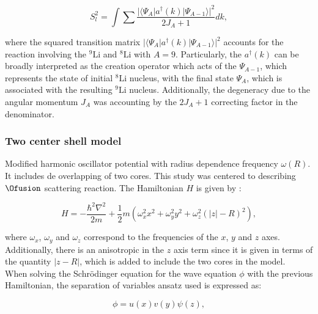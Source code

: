 \documentclass[openany]{book}
\begin{document}
\begin{equation}\label{eq:micro_shellGamow_spectroscopic}
	S^2_{l} = \int {\sum \frac{|\langle \Psi_A | a^{\dagger}(k)| \Psi_{A-1} \rangle |^2}{2J_A + 1}} dk,
\end{equation}

where the squared transition matrix $|\langle \Psi_A | a^{\dagger}(k)| \Psi_{A-1} \rangle |^2$ accounts for the reaction involving the $\mathrm{{}^{9}Li}$ and $\mathrm{{}^{8}Li}$ with $A = 9$. Particularly, the $a^{\dagger}(k)$ can be broadly interpreted as the creation operator which acts of the $\Psi_{A-1}$, which represents the state of initial $\mathrm{{}^{8}Li}$ nucleus, with the final state $\Psi_{A}$, which is associated with the resulting  $\mathrm{{}^{9}Li}$ nucleus. Additionally, the degeneracy due to the angular momentum $J_A$ was accounting by the $2J_A + 1 $  correcting factor in the denominator. \\


\subsubsection{Two center shell model}

Modified harmonic oscillator potential with radius dependence frequency $\omega(R)$. It includes de overlapping of two cores. This study was centered to describing $\Ofusion$ scattering reaction. The Hamiltonian $H$ is given by  \cite{tazawa_1974}: 

\begin{equation}\label{eq:micro_twoCenterShell_Hamltonian}
	H = -\frac{\hbar^2\nabla^2}{2m} + \frac{1}{2}m (\omega^2_x  x^2  + \omega^2_y y^2 + \omega^2_z (|z| - R)^2),
\end{equation}

where $\omega_x$, $\omega_y$ and $\omega_z$ correspond to the frequencies of the $x$, $y$ and $z$ axes. Additionally, there is an anisotropic in the $z$ axis term since it is given in terms of the quantity $|z-R|$, which is added to include the two cores in the model. \\

When solving the Schrödinger equation for the wave equation $\phi$ with the previous Hamiltonian, the separation of variables ansatz used is expressed as: 

\begin{equation}\label{eq:micro_twoCenterShell_anzats}
	\phi = u (x) v (y) \psi (z),
\end{equation}
\end{document}
